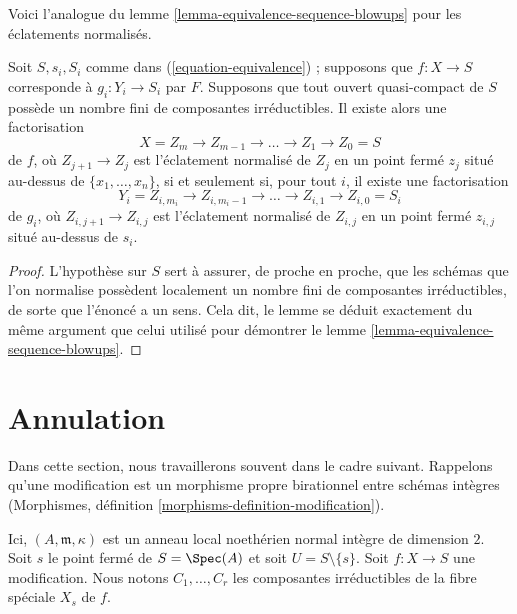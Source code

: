 \noindent Voici l'analogue du lemme \ref{lemma-equivalence-sequence-blowups} pour les éclatements normalisés.

\begin{lemma} \label{lemma-equivalence-sequence-normalized-blowups} Soit $S, s_i, S_i$ comme dans (\ref{equation-equivalence}) ; supposons que $f : X \to S$ corresponde à $g_i : Y_i \to S_i$ par $F$. Supposons que tout ouvert quasi-compact de $S$ possède un nombre fini de composantes irréductibles. Il existe alors une factorisation $$
X = Z_m \to Z_{m - 1} \to \ldots \to Z_1 \to Z_0 = S
$$ de $f$, où $Z_{j + 1} \to Z_j$ est l'éclatement normalisé de $Z_j$ en un point fermé $z_j$ situé au-dessus de $\{x_1, \ldots, x_n\}$, si et seulement si, pour tout $i$, il existe une factorisation $$
Y_i = Z_{i, m_i} \to Z_{i, m_i - 1} \to \ldots \to Z_{i, 1} \to Z_{i, 0} = S_i
$$ de $g_i$, où $Z_{i, j + 1} \to Z_{i, j}$ est l'éclatement normalisé de $Z_{i, j}$ en un point fermé $z_{i, j}$ situé au-dessus de $s_i$. \end{lemma}

\begin{proof} L'hypothèse sur $S$ sert à assurer, de proche en proche, que les schémas que l'on normalise possèdent localement un nombre fini de composantes irréductibles, de sorte que l'énoncé a un sens. Cela dit, le lemme se déduit exactement du même argument que celui utilisé pour démontrer le lemme \ref{lemma-equivalence-sequence-blowups}. \end{proof}








\section{Annulation} \label{section-vanishing}

\noindent Dans cette section, nous travaillerons souvent dans le cadre suivant. Rappelons qu'une modification est un morphisme propre birationnel entre schémas intègres (Morphismes, définition \ref{morphisms-definition-modification}).

\begin{situation} \label{situation-vanishing} Ici, $(A, \mathfrak m, \kappa)$ est un anneau local noethérien normal intègre de dimension $2$. Soit $s$ le point fermé de $S = \Spec(A)$ et soit $U = S \setminus \{s\}$. Soit $f : X \to S$ une modification. Nous notons $C_1, \ldots, C_r$ les composantes irréductibles de la fibre spéciale $X_s$ de $f$. \end{situation}

